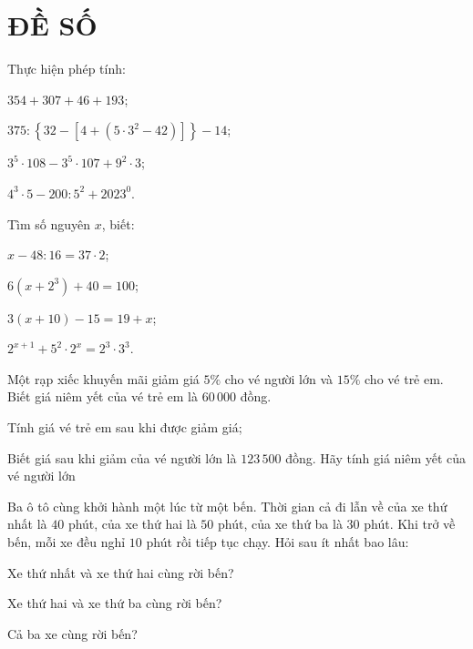 \section{ĐỀ SỐ \thesection } %
\setcounter{bt}{0}

\begin{bt} Thực hiện phép tính:
		\begin{listEX}[2]	
			\item $354 + 307 + 46 + 193$;
			\item $375 : \left\{ 32 - \left[ 4 + (5 \cdot 3^2 - 42) \right] \right\} - 14$;
			\item $3^5 \cdot 108 - 3^5 \cdot 107 + 9^2 \cdot 3$;
			\item $4^3 \cdot 5 - 200 : 5^2 + 2023^0$.
		\end{listEX}
\end{bt}


\begin{bt} Tìm số nguyên $x$, biết:
		\begin{listEX}[2]
		 \item $x - 48 : 16 = 37 \cdot 2$;
		\item $6(x + 2^3) + 40 = 100$;
		\item $3(x + 10) - 15 = 19+x$;
		\item $2^{x+1}+5^2\cdot 2^x=2^3\cdot 3^3$.
		\end{listEX}
\end{bt}


\begin{bt} Một rạp xiếc khuyến mãi giảm giá $5\%$ cho vé người lớn và $15\%$ cho vé trẻ em. Biết giá niêm yết của vé trẻ em là $60\,000$ đồng.
	\begin{listEX}
		\item Tính giá vé trẻ em sau khi được giảm giá; 
		\item Biết giá sau khi giảm của vé người lớn là $123\,500$ đồng. Hãy tính giá niêm yết của vé người lớn
	\end{listEX}
\end{bt}


\begin{bt} Ba ô tô cùng khởi hành một lúc từ một bến. Thời gian cả đi lẫn về của xe thứ nhất là $40$ phút, của xe thứ hai là $50$ phút, của xe thứ ba là $30$ phút. Khi trở về bến, mỗi xe đều nghỉ $10$ phút rồi tiếp tục chạy. Hỏi sau ít nhất bao lâu:
	\begin{listEX}[2]
	 \item Xe thứ nhất và xe thứ hai cùng rời bến?
	\item Xe thứ hai và xe thứ ba cùng rời bến?
	\item Cả ba xe cùng rời bến?
	\end{listEX}
\end{bt}



